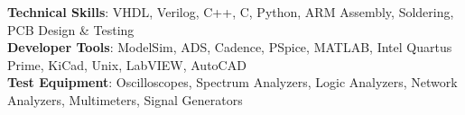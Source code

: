 \documentclass[letterpaper,11pt]{article}
\makeatletter
\newcommand{\resumeItem}[1]{
  \item\small{
    {#1 \vspace{-3pt}}
  }
}
\newcommand{\resumeSubheading}[4]{
  \vspace{-3pt}\item
    \begin{tabular*}{1.0\textwidth}[t]{l@{\extracolsep{\fill}}r}
      \textbf{#1} & \textbf{\small #2} \\
      \textit{\small#3} & \textit{\small #4} \\
    \end{tabular*}\vspace{-7pt}
}
\newcommand{\resumeSubHeadingListStart}{\begin{itemize}[leftmargin=0.0in, label={}]}
\newcommand{\resumeSubHeadingListEnd}{\end{itemize}}
\newcommand{\resumeItemListStart}{\begin{itemize}}
\newcommand{\resumeItemListEnd}{\end{itemize}\vspace{0pt}}
\makeatother
\begin{document}
    \begin{itemize}
    [leftmargin=0.15in, label={}]\small{\item{
        \textbf{Technical Skills}{: VHDL, Verilog, C++, C, Python, ARM Assembly, Soldering, PCB Design \& Testing} \\
        \textbf{Developer Tools}{: ModelSim, ADS, Cadence, PSpice, MATLAB, Intel Quartus Prime, KiCad, Unix, LabVIEW, AutoCAD} \\
        \textbf{Test Equipment}{: Oscilloscopes, Spectrum Analyzers, Logic Analyzers, Network Analyzers, Multimeters, Signal Generators} \\
        }}


\    \end{itemize}
    

  
        
\end{document}
